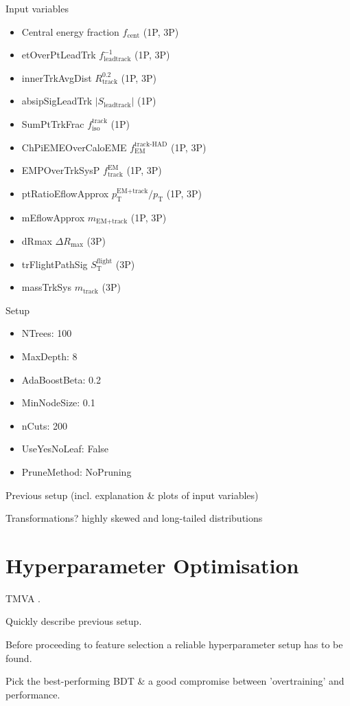Input variables
\begin{itemize}
\item Central energy fraction $f_\text{cent}$ (1P, 3P)
\item etOverPtLeadTrk $f_\text{leadtrack}^{-1}$ (1P, 3P)
\item innerTrkAvgDist $R_\text{track}^{0.2}$ (1P, 3P)
\item absipSigLeadTrk $\left| S_\text{leadtrack} \right|$ (1P)
\item SumPtTrkFrac $f_\text{iso}^\text{track}$ (1P)
\item ChPiEMEOverCaloEME $f_\text{EM}^\text{track-HAD}$ (1P, 3P)
\item EMPOverTrkSysP $f_\text{track}^\text{EM}$ (1P, 3P)
\item ptRatioEflowApprox $p_\text{T}^\text{EM+track} / p_\text{T}$ (1P, 3P)
\item mEflowApprox $m_\text{EM+track}$ (1P, 3P)
\item dRmax $\Delta R_\text{max}$ (3P)
\item trFlightPathSig $S_\text{T}^\text{flight}$ (3P)
\item massTrkSys $m_\text{track}$ (3P)
\end{itemize}

Setup
\begin{itemize}
\item NTrees: 100
\item MaxDepth: 8
\item AdaBoostBeta: 0.2
\item MinNodeSize: 0.1
\item nCuts: 200
\item UseYesNoLeaf: False
\item PruneMethod: NoPruning
\end{itemize}
Previous setup (incl. explanation \& plots of input variables)

Transformations? highly skewed and long-tailed distributions

\section{Hyperparameter Optimisation}
\label{sec:bdt_hyperparam}

TMVA \cite{tmva}.

Quickly describe previous setup.

Before proceeding to feature selection a reliable hyperparameter setup has to be
found.

Pick the best-performing BDT \& a good compromise between 'overtraining' and
performance.

